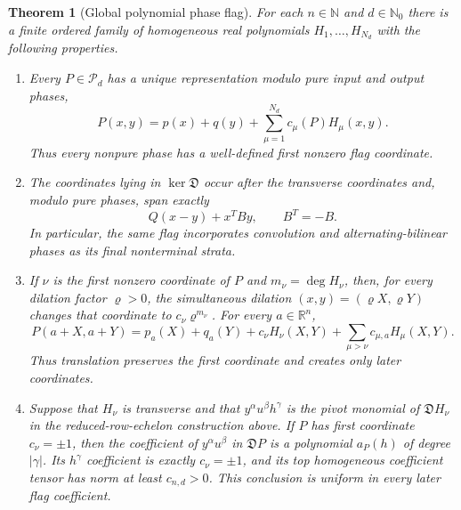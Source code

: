 \documentclass[11pt]{article}
\numberwithin{equation}{section}
\newtheorem{theorem}{Theorem}[section]
\theoremstyle{remark}
\theoremstyle{definition}
\newcommand{\R}{\mathbb R}
\newcommand{\Dop}{\mathfrak D}
\begin{document}
\begin{theorem}[Global polynomial phase flag]\label{thm:phaseflag}
For each $n\in\mathbb N$ and $d\in\mathbb N_0$ there is a finite ordered
family of homogeneous real
polynomials $H_1,\ldots,H_{N_d}$ with the following properties.
\begin{enumerate}[label=\textup{(\roman*)}]
\item Every $P\in\mathcal P_d$ has a unique representation modulo pure
input and output phases,
\begin{equation}\label{eq:flagrepresentation}
 P(x,y)=p(x)+q(y)+\sum_{\mu=1}^{N_d}c_\mu(P)H_\mu(x,y).
\end{equation}
Thus every nonpure phase has a well-defined first nonzero flag coordinate.
\item The coordinates lying in $\ker\Dop$ occur after the transverse
coordinates and, modulo pure phases, span exactly
\[
 Q(x-y)+x^TBy,\qquad B^T=-B.
\]
In particular, the same flag incorporates convolution and
alternating-bilinear phases as its final nonterminal strata.
\item If $\nu$ is the first nonzero coordinate of $P$ and
$m_\nu=\deg H_\nu$, then, for every dilation factor $\varrho>0$, the
simultaneous dilation $(x,y)=(\varrho X,\varrho Y)$ changes that coordinate
to $c_\nu\varrho^{m_\nu}$.  For every $a\in\R^n$,
\begin{equation}\label{eq:triangular}
 P(a+X,a+Y)=p_a(X)+q_a(Y)+c_\nu H_\nu(X,Y)
 +\sum_{\mu>\nu}c_{\mu,a}H_\mu(X,Y).
\end{equation}
Thus translation preserves the first coordinate and creates only later
coordinates.
\item Suppose that $H_\nu$ is transverse and that
$y^\alpha u^\beta h^\gamma$ is the pivot monomial of
$\Dop H_\nu$ in the reduced-row-echelon construction above.  If $P$ has
first coordinate $c_\nu=\pm1$, then the coefficient of
$y^\alpha u^\beta$ in $\Dop P$ is a polynomial $a_P(h)$ of degree
$|\gamma|$.  Its $h^\gamma$ coefficient is exactly $c_\nu=\pm1$, and its
top homogeneous coefficient tensor has norm at least $c_{n,d}>0$.
This conclusion is uniform in every later flag coefficient.
\end{enumerate}
\end{theorem}
\end{document}
